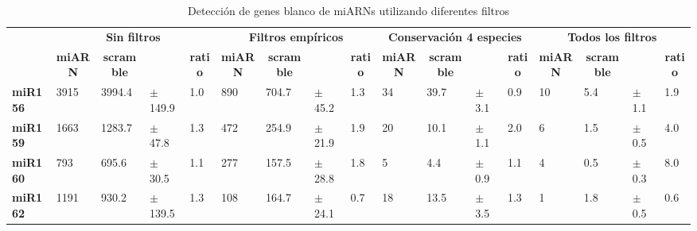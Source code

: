 \begin{landscape}
\begin{table}[]
\scriptsize
\centering
\caption{Detección de genes blanco de miARNs utilizando diferentes filtros}
\label{table:NAR_table_2}
\begin{tabular}{lllllllllllllllll}
\multicolumn{1}{c}{} & \multicolumn{4}{c}{\textbf{Sin filtros}}                        & \multicolumn{4}{c}{\textbf{Filtros empíricos}}                  & \multicolumn{4}{c}{\textbf{Conservación 4 especies}}            & \multicolumn{4}{c}{\textbf{Todos los filtros}}                  \\
\multicolumn{1}{c}{} & \multicolumn{1}{c}{\textbf{miARN}} & \multicolumn{1}{c}{\textbf{scramble}} & \multicolumn{1}{c}{\textbf{}} & \multicolumn{1}{c}{\textbf{ratio}} & \multicolumn{1}{c}{\textbf{miARN}} & \multicolumn{1}{c}{\textbf{scramble}} & \multicolumn{1}{c}{\textbf{}} & \multicolumn{1}{c}{\textbf{ratio}} & \multicolumn{1}{c}{\textbf{miARN}} & \multicolumn{1}{c}{\textbf{scramble}} & \multicolumn{1}{c}{\textbf{}} & \multicolumn{1}{c}{\textbf{ratio}} & \multicolumn{1}{c}{\textbf{miARN}} & \multicolumn{1}{c}{\textbf{scramble}} & \multicolumn{1}{c}{\textbf{}} & \multicolumn{1}{c}{\textbf{ratio}} \\
\textbf{miR156}      & 3915           & 3994.4            & $\pm$ 149.9     & 1.0            & 890            & 704.7             & $\pm$  45.2      & 1.3            & 34             & 39.7              & $\pm$  3.1       & 0.9            & 10             & 5.4               & $\pm$  1.1       & 1.9            \\
\textbf{miR159}      & 1663           & 1283.7            & $\pm$  47.8      & 1.3            & 472            & 254.9             & $\pm$  21.9      & 1.9            & 20             & 10.1              & $\pm$  1.1       & 2.0            & 6              & 1.5               & $\pm$  0.5       & 4.0            \\
\textbf{miR160}      & 793            & 695.6             & $\pm$  30.5      & 1.1            & 277            & 157.5             & $\pm$  28.8      & 1.8            & 5              & 4.4               & $\pm$  0.9       & 1.1            & 4              & 0.5               & $\pm$  0.3       & 8.0            \\
\textbf{miR162}      & 1191           & 930.2             & $\pm$  139.5     & 1.3            & 108            & 164.7             & $\pm$  24.1      & 0.7            & 18             & 13.5              & $\pm$  3.5       & 1.3            & 1              & 1.8               &  $\pm$ 0.5       & 0.6            \\

\end{tabular}
\end{table}
\end{landscape}
